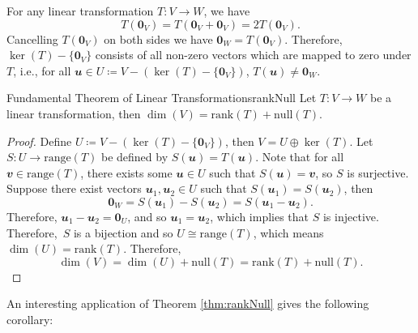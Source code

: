 \documentclass[math, code]{amznotes}
\theoremstyle{remark}
\newcommand{\zero}{\mathbf{0}}
\begin{document}
For any linear transformation $T \colon V \to W$, we have 
\begin{equation*}
    T(\zero_V) = T(\zero_V + \zero_V) = 2T(\zero_V).
\end{equation*}
Cancelling $T(\zero_V)$ on both sides we have $\zero_W = T(\zero_V)$. Therefore, $\ker(T) - \{\zero_V\}$ consists of all non-zero vectors which are mapped to zero under $T$, i.e., for all $\mathbfit{u} \in U \coloneqq V - (\ker(T) - \{\zero_V\})$, $T(\mathbfit{u}) \neq \zero_W$. 
\begin{thmbox}{Fundamental Theorem of Linear Transformations}{rankNull}
    Let $T \colon V \to W$ be a linear transformation, then $\dim(V) = \mathrm{rank}(T) + \mathrm{null}(T)$.
    \tcblower
    \begin{proof}
        Define $U \coloneqq V - (\ker(T) - \{\zero_V\})$, then $V = U \oplus \ker(T)$. Let $S \colon U \to \mathrm{range}(T)$ be defined by $S(\mathbfit{u}) = T(\mathbfit{u})$. Note that for all $\mathbfit{v} \in \mathrm{range}(T)$, there exists some $\mathbfit{u} \in U$ such that $S(\mathbfit{u}) = \mathbfit{v}$, so $S$ is surjective. Suppose there exist vectors $\mathbfit{u}_1, \mathbfit{u}_2 \in U$ such that $S(\mathbfit{u}_1) = S(\mathbfit{u}_2)$, then
        \begin{equation*}
            \zero_W = S(\mathbfit{u}_1) - S(\mathbfit{u}_2) = S(\mathbfit{u}_1 - \mathbfit{u}_2).
        \end{equation*}
        Therefore, $\mathbfit{u}_1 - \mathbfit{u}_2 = \zero_U$, and so $\mathbfit{u}_1 = \mathbfit{u}_2$, which implies that $S$ is injective. Therefore,~$S$ is a bijection and so $U \cong \mathrm{range}(T)$, which means $\dim(U) = \mathrm{rank}(T)$. Therefore,
        \begin{equation*}
            \dim(V) = \dim(U) + \mathrm{null}(T) = \mathrm{rank}(T) + \mathrm{null}(T).
        \end{equation*}
    \end{proof}
\end{thmbox}
An interesting application of Theorem \ref{thm:rankNull} gives the following corollary:
\end{document}
